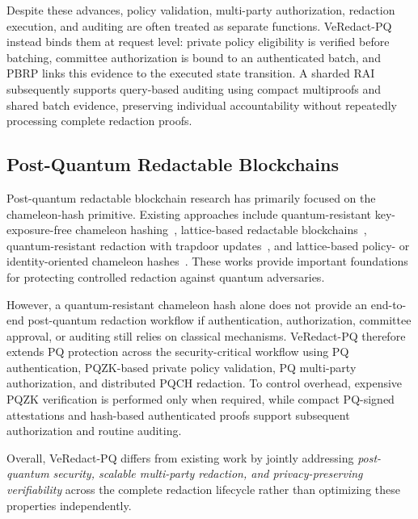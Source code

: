\documentclass[lettersize,journal]{IEEEtran}
\begin{document}
Despite these advances, policy validation, multi-party authorization,
redaction execution, and auditing are often treated as separate
functions. VeRedact-PQ instead binds them at request level: private
policy eligibility is verified before batching, committee authorization
is bound to an authenticated batch, and PBRP links this evidence to the
executed state transition. A sharded RAI subsequently supports
query-based auditing using compact multiproofs and shared batch
evidence, preserving individual accountability without repeatedly
processing complete redaction proofs.

\subsection{Post-Quantum Redactable Blockchains}

Post-quantum redactable blockchain research has primarily focused on
the chameleon-hash primitive. Existing approaches include
quantum-resistant key-exposure-free chameleon hashing~\cite{ref11},
lattice-based redactable blockchains~\cite{ref10}, quantum-resistant
redaction with trapdoor updates~\cite{ref17}, and lattice-based policy-
or identity-oriented chameleon hashes~\cite{ref18,ref37}. These works
provide important foundations for protecting controlled redaction
against quantum adversaries.

However, a quantum-resistant chameleon hash alone does not provide an
end-to-end post-quantum redaction workflow if authentication,
authorization, committee approval, or auditing still relies on
classical mechanisms. VeRedact-PQ therefore extends PQ protection
across the security-critical workflow using PQ authentication,
PQZK-based private policy validation, PQ multi-party authorization, and
distributed PQCH redaction. To control overhead, expensive PQZK
verification is performed only when required, while compact PQ-signed
attestations and hash-based authenticated proofs support subsequent
authorization and routine auditing.

Overall, VeRedact-PQ differs from existing work by jointly addressing
\emph{post-quantum security, scalable multi-party redaction, and
privacy-preserving verifiability} across the complete redaction
lifecycle rather than optimizing these properties independently.
\end{document}
